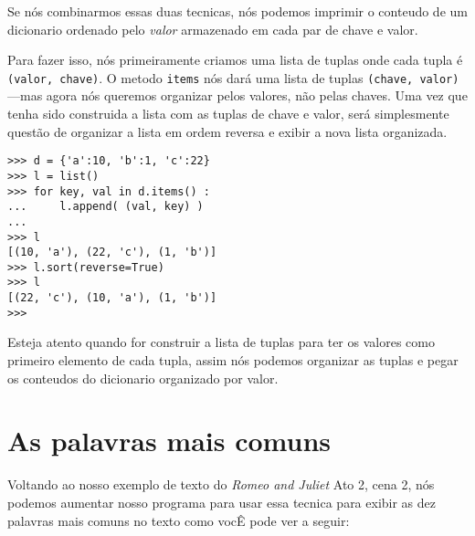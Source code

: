 Se nós combinarmos essas duas tecnicas, nós podemos imprimir o conteudo
de um dicionario ordenado pelo \emph{valor} armazenado em cada par de 
chave e valor.

Para fazer isso, nós primeiramente criamos uma lista de tuplas onde cada tupla é
{\tt (valor, chave)}. O metodo {\tt items} nós dará uma lista de tuplas 
{\tt (chave, valor)} ---mas agora nós queremos organizar pelos valores, não pelas chaves.
Uma vez que tenha sido construida a lista com as tuplas de chave e valor, será
simplesmente questão de organizar a lista em ordem reversa e exibir a nova 
lista organizada.

\beforeverb
\begin{verbatim}
>>> d = {'a':10, 'b':1, 'c':22}
>>> l = list()
>>> for key, val in d.items() :
...     l.append( (val, key) )
... 
>>> l
[(10, 'a'), (22, 'c'), (1, 'b')]
>>> l.sort(reverse=True)
>>> l
[(22, 'c'), (10, 'a'), (1, 'b')]
>>> 
\end{verbatim}
\afterverb
%
Esteja atento quando for construir a lista de tuplas para ter os valores como
primeiro elemento de cada tupla, assim nós podemos organizar as tuplas e pegar os
conteudos do dicionario organizado por valor.

\section{As palavras mais comuns}

Voltando ao nosso exemplo de texto do \emph{Romeo and Juliet}
Ato 2, cena 2, nós podemos aumentar nosso programa para usar essa tecnica
para exibir as dez palavras mais comuns no texto como vocÊ pode ver a seguir:

